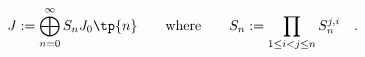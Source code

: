 \begin{equation}
  J:=\bigoplus_{n=0}^\infty S_nJ_0\tp{n}\quad\quad\mathrm{where}\qquad S_n := \prod_{1\leq i<j\leq n}S_n^{j,i}\quad.
\end{equation}

